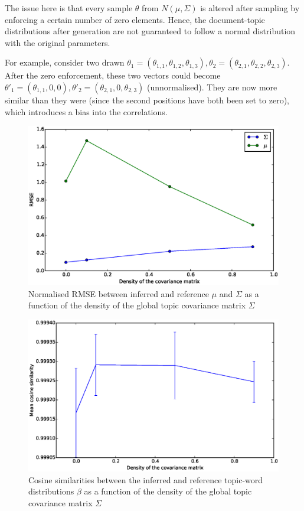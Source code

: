 \documentclass[12pt,a4paper,twoside,openright]{report}
\begin{document}
The issue here is that every sample $\theta$ from $N(\mu, \Sigma)$ is altered after sampling by enforcing a certain number of zero elements. Hence, the document-topic distributions after generation are not guaranteed to follow a normal distribution with the original parameters.

For example, consider two drawn $\theta_1 = (\theta_{1,1}, \theta_{1,2}, \theta_{1,3}), \theta_2 = (\theta_{2,1}, \theta_{2,2}, \theta_{2,3})$. After the zero enforcement, these two vectors could become $\theta'_1 = (\theta_{1,1}, 0, 0), \theta'_2 = (\theta_{2,1}, 0, \theta_{2,3})$ (unnormalised). They are now more similar than they were (since the second positions have both been set to zero), which introduces a bias into the correlations.

\begin{figure}[!htb]
\includegraphics[width=\textwidth]{sim-sigmadensity-musigma.eps}
\caption{Normalised RMSE between inferred and reference $\mu$ and $\Sigma$ as a function of the density of the global topic covariance matrix $\Sigma$}
\label{fig:sim-sigmadensity-musigma}
\end{figure}

\begin{figure}[!htb]
\includegraphics[width=\textwidth]{sim-sigmadensity-beta.eps}
\caption{Cosine similarities between the inferred and reference topic-word distributions $\beta$ as a function of the density of the global topic covariance matrix $\Sigma$}
\label{fig:sim-sigmadensity-beta}
\end{figure}
\end{document}
